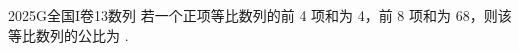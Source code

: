
\begin{problem}{2025}{G}{全国I卷}{13}{数列}
若一个正项等比数列的前 4 项和为 4，前 8 项和为 68，则该等比数列的公比为 \underline{\hspace{4em}}.
\end{problem}